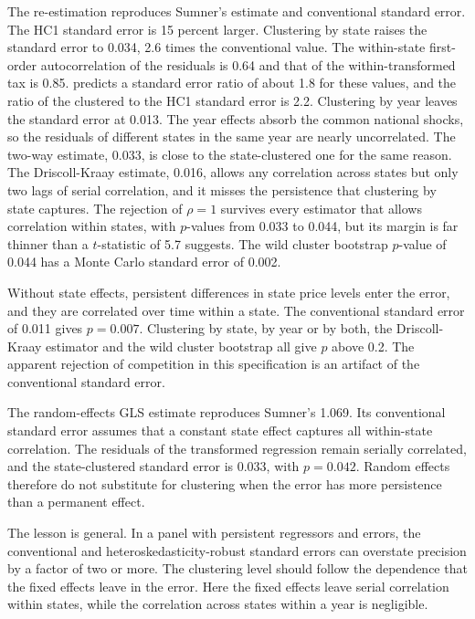 The re-estimation reproduces Sumner's estimate and conventional standard error. The HC1 standard error is 15
percent larger. Clustering by state raises the standard error to 0.034, 2.6 times the conventional value. The
within-state first-order autocorrelation of the residuals is 0.64 and that of the within-transformed tax is 0.85.
 predicts a standard error ratio of about 1.8 for these values, and the ratio of the clustered to
the HC1 standard error is 2.2. Clustering by year leaves the standard error at 0.013. The year effects absorb the
common national shocks, so the residuals of different states in the same year are nearly uncorrelated. The two-way
estimate, 0.033, is close to the state-clustered one for the same reason. The Driscoll-Kraay estimate, 0.016, allows
any correlation across states but only two lags of serial correlation, and it misses the persistence that clustering
by state captures. The rejection of $\rho = 1$ survives every estimator that allows correlation within states, with
$p$-values from 0.033 to 0.044, but its margin is far thinner than a $t$-statistic of 5.7 suggests. The wild cluster
bootstrap $p$-value of 0.044 has a Monte Carlo standard error of 0.002.

Without state effects, persistent differences in state price levels enter the error, and they are correlated over
time within a state. The conventional standard error of 0.011 gives $p = 0.007$. Clustering by state, by year or by both, the
Driscoll-Kraay estimator and the wild cluster bootstrap all give $p$ above 0.2. The apparent rejection of competition in this specification is an
artifact of the conventional standard error.

The random-effects GLS estimate reproduces Sumner's 1.069. Its conventional standard error assumes that a constant
state effect captures all within-state correlation. The residuals of the transformed regression remain serially
correlated, and the state-clustered standard error is 0.033, with $p = 0.042$. Random effects therefore do not
substitute for clustering when the error has more persistence than a permanent effect.

The lesson is general. In a panel with persistent regressors and errors, the conventional and heteroskedasticity-robust
standard errors can overstate precision by a factor of two or more. The clustering level should follow the
dependence that the fixed effects leave in the error. Here the fixed effects leave serial correlation within
states, while the correlation across states within a year is negligible.


